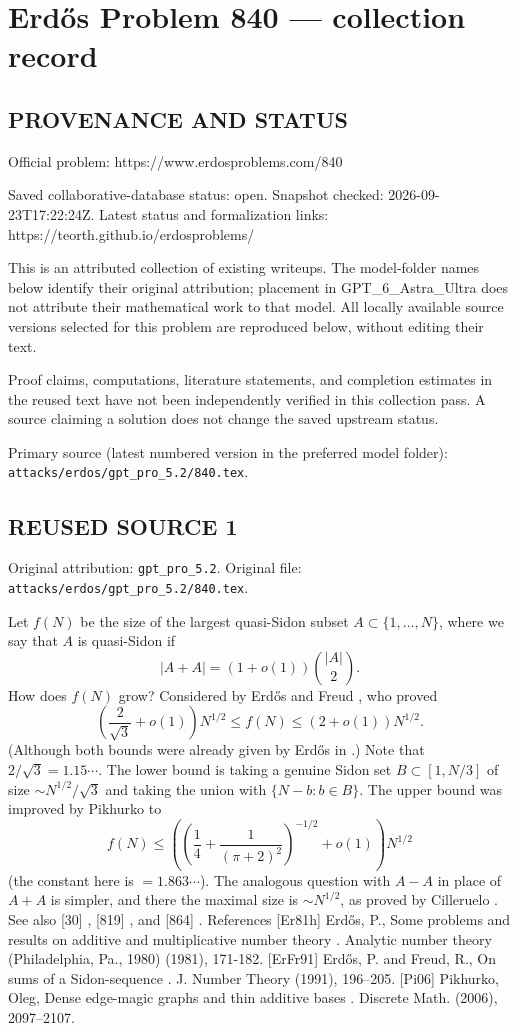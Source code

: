 \section*{Erd\H{o}s Problem 840 --- collection record}

\subsection*{PROVENANCE AND STATUS}
Official problem: https://www.erdosproblems.com/840

Saved collaborative-database status: open.
Snapshot checked: 2026-09-23T17:22:24Z.
Latest status and formalization links: https://teorth.github.io/erdosproblems/

This is an attributed collection of existing writeups. The model-folder names below identify their original attribution; placement in GPT\_6\_Astra\_Ultra does not attribute their mathematical work to that model. All locally available source versions selected for this problem are reproduced below, without editing their text.

Proof claims, computations, literature statements, and completion estimates in the reused text have not been independently verified in this collection pass. A source claiming a solution does not change the saved upstream status.

Primary source (latest numbered version in the preferred model folder): \texttt{attacks/erdos/gpt\_pro\_5.2/840.tex}.

\subsection*{REUSED SOURCE 1}
Original attribution: \texttt{gpt\_pro\_5.2}.
Original file: \texttt{attacks/erdos/gpt\_pro\_5.2/840.tex}.


Let $f(N)$ be the size of the largest quasi-Sidon subset $A\subset\{1,\ldots,N\}$, where we say that $A$ is quasi-Sidon if\[\lvert A+A\rvert=(1+o(1))\binom{\lvert A\rvert}{2}.\]How does $f(N)$ grow? Considered by Erd\H{o}s and Freud \cite{ErFr91}, who proved\[\left(\frac{2}{\sqrt{3}}+o(1)\right)N^{1/2} \leq f(N) \leq \left(2+o(1)\right)N^{1/2}.\](Although both bounds were already given by Erd\H{o}s in \cite{Er81h}.) Note that $2/\sqrt{3}=1.15\cdots$. The lower bound is taking a genuine Sidon set $B\subset [1,N/3]$ of size $\sim N^{1/2}/\sqrt{3}$ and taking the union with $\{N-b : b\in B\}$. The upper bound was improved by Pikhurko \cite{Pi06} to\[f(N) \leq \left(\left(\frac{1}{4}+\frac{1}{(\pi+2)^2}\right)^{-1/2}+o(1)\right)N^{1/2}\](the constant here is $=1.863\cdots$). The analogous question with $A-A$ in place of $A+A$ is simpler, and there the maximal size is $\sim N^{1/2}$, as proved by Cilleruelo . See also [30] , [819] , and [864] . References [Er81h] Erd\H{o}s, P., Some problems and results on additive and multiplicative number theory . Analytic number theory (Philadelphia, Pa., 1980) (1981), 171-182. [ErFr91] Erd\H{o}s, P. and Freud, R., On sums of a {S}idon-sequence . J. Number Theory (1991), 196--205. [Pi06] Pikhurko, Oleg, Dense edge-magic graphs and thin additive bases . Discrete Math. (2006), 2097--2107.


